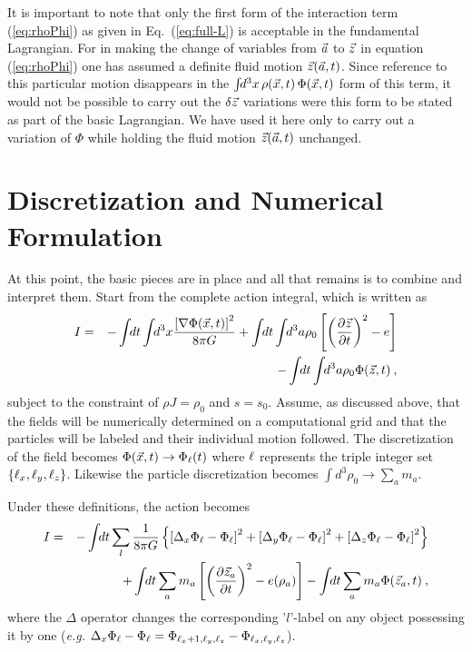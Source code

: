 It is important to note that only the first form of the interaction term
(\ref{eq:rhoPhi}) as given in Eq.~(\ref{eq:full-L}) is acceptable in the
fundamental Lagrangian.  For in making the change of variables from ${\vec a}$ to
${\vec z}$ in equation (\ref{eq:rhoPhi}) one has assumed a definite fluid motion
${\vec z}({\vec a},t)$. Since reference to this particular motion disappears in the
$\int\!\! d^3x\, \rho({\vec x},t)\, \Phi({\vec x},t)$ form of this term, it would not be
possible to carry out the $\delta {\vec z}$ variations were this form to be stated
as part of the basic Lagrangian.  We have used it here only to carry out a
variation of $\Phi$ while holding the fluid motion ${\vec z}({\vec a},t)$ unchanged.


\section{Discretization and Numerical Formulation}\label{Disc.}

At this point, the basic pieces are in place and all that remains is to combine
and interpret them.  Start from the complete action integral, which is written
as
\begin{eqnarray}
I  & = & - \int\!\! dt \int\!\! d^3x
           \frac{\left[\nabla \Phi(\x,t)\right]^2}{8 \pi G}
         + \int\!\! dt \int\!\! d^3a \rho_0 \left[ \left(\frac{\partial \z}
          {\partial t}\right)^2 - e \right] \nonumber \\
   &   & - \int\!\! dt \int\!\! d^3 a \rho_0 \Phi(\z,t) \eqc
\end{eqnarray}
%
subject to the constraint of $\rho J = \rho_0$ and $s = s_0$.  Assume, as
discussed above, that the fields will be numerically determined on a
computational grid and that the particles will be labeled and their individual
motion followed.  The discretization of the field becomes
$\Phi({\vec x},t) \rightarrow \Phi_{\ell}(t)$ where ${\ell}$ represents the triple integer
set $\left\{{\ell}_x, {\ell}_y, {\ell}_z\right\}$.  Likewise the particle discretization
becomes $ \int d^3 \rho_0 \rightarrow \sum_{a} m_a$.

Under these definitions, the action becomes
\begin{eqnarray}
I & = & - \int\!\! dt \sum_{l} \frac{1}{8 \pi G}
        \left\{
         \left[ {\Delta}_x {\Phi_{\ell}} - {\Phi_{\ell}} \right]^2 +
         \left[ {\Delta}_y {\Phi_{\ell}} - {\Phi_{\ell}} \right]^2 +
         \left[ {\Delta}_z {\Phi_{\ell}} - {\Phi_{\ell}} \right]^2
        \right\} \nonumber \\
  &   &
      + \int\!\! dt \sum_{a} m_a \left[ \left(\frac{\partial {\vec z}_a}
         {\partial t}\right)^2 - e(\rho_a) \right]
      - \int\!\! dt \sum_{a} m_a \Phi({\vec z}_a,t) \: ,
\end{eqnarray}
where the $\Delta$ operator changes the corresponding '$l$'-label on any object
possessing it by one ({\it e.g.} $\Delta_x {\Phi_{\ell}} - {\Phi_{\ell}} = \Phi_{{\ell}_x+1,{\ell}_y,{\ell}_z} -
\Phi_{{\ell}_x,{\ell}_y,{\ell}_z}$).

